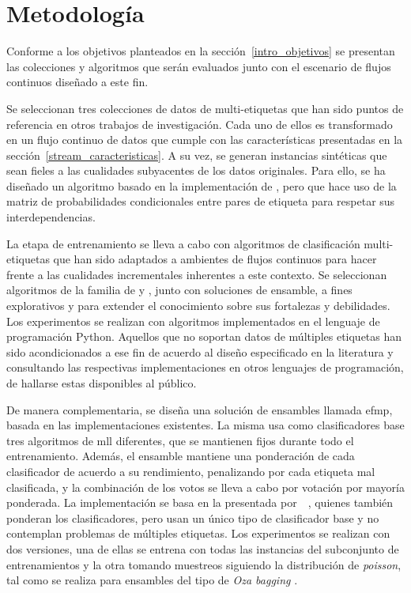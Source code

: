 \chapter{Metodología}
\label{chapter:metodologia}

Conforme a los objetivos planteados en la sección~\ref{intro_objetivos} se
presentan las colecciones y algoritmos que serán evaluados junto con el
escenario de flujos continuos diseñado a este fin.

Se seleccionan tres colecciones de datos de multi-etiquetas que han sido puntos
de referencia en otros trabajos de investigación. Cada uno de ellos es
transformado en un flujo continuo de datos que cumple con las características
presentadas en la sección~\ref{stream_caracteristicas}. A su vez, se generan
instancias sintéticas que sean fieles a las cualidades subyacentes de los datos
originales.  Para ello, se ha diseñado un algoritmo basado en la implementación
de \citeauthor{read_multi-label_2008} \cite{read_multi-label_2008}, pero que hace
uso de la matriz de probabilidades condicionales entre pares de etiqueta para
respetar sus interdependencias.

La etapa de entrenamiento se lleva a cabo con algoritmos de clasificación
multi-etiquetas que han sido adaptados a ambientes de flujos continuos para
hacer frente a las cualidades incrementales inherentes a este contexto. Se
seleccionan algoritmos de la familia de  y
, junto con soluciones de ensamble, a fines
explorativos y para extender el conocimiento sobre sus fortalezas y debilidades.
Los experimentos se realizan con algoritmos implementados en el lenguaje de
programación Python.  Aquellos que no soportan datos de múltiples etiquetas han
sido acondicionados a ese fin de acuerdo al diseño especificado en la literatura
y consultando las respectivas implementaciones en otros lenguajes de
programación, de hallarse estas disponibles al público.

De manera complementaria, se diseña una solución de ensambles llamada
\acrfull{efmp}, basada en las implementaciones existentes. La misma usa como
clasificadores base tres algoritmos de \acrshort{mll} diferentes, que se
mantienen fijos durante todo el entrenamiento.  Además, el ensamble mantiene una
ponderación de cada clasificador de acuerdo a su rendimiento, penalizando por
cada etiqueta mal clasificada, y la combinación de los votos se lleva a cabo por
votación por mayoría ponderada. La implementación se basa en la presentada
por~\citeauthor{kolter_dynamic_2007}~\cite{kolter_dynamic_2007}, quienes también
ponderan los clasificadores, pero usan un único tipo de clasificador base y no
contemplan problemas de múltiples etiquetas. Los experimentos se realizan con
dos versiones, una de ellas se entrena con todas las instancias del subconjunto
de entrenamientos y la otra tomando muestreos siguiendo la distribución de
\textit{poisson}, tal como se realiza para ensambles del tipo de \textit{Oza
	bagging} \cite{oza_online_2005}.

